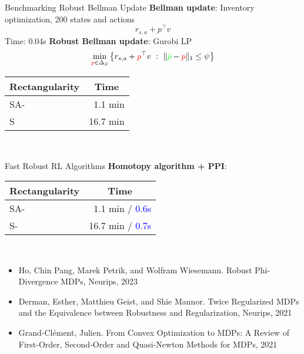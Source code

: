 \documentclass{beamer}
\newcommand{\tc}[2]{\textcolor{#1}{#2}}
\newcommand{\tcb}[1]{\tc{blue}{#1}}
\newcommand{\tcr}[1]{\tc{red}{#1}}
\newcommand{\tcg}[1]{\tc{green}{#1}}
\newcommand{\tr}{^{\top}}
\begin{document}
\begin{frame}{Benchmarking Robust Bellman Update}
    \textbf{Bellman update}: {\footnotesize Inventory optimization, 200 states and actions}
    \[  r_{s,a} + p\tr v  \]
    Time: 0.04s
    \vfill
    \textbf{Robust Bellman update}: 	{\small Gurobi LP}
    \[ \min_{\tcr{p}\in\Delta_S}  \left\{ r_{s,a} + \tcr{p}\tr v   ~:~ \| \tcg{\bar{p}} - \tcr{p} \|_1 \le \psi \right\} \]
    \begin{center}
    \begin{tabular}{|l|r|}
        \toprule
    \textbf{Rectangularity} & \multicolumn{1}{c|}{\textbf{Time}} \\
        \midrule
        SA- & 1.1 min  \\
        \hline
        S & 16.7 min \\
        \bottomrule
    \end{tabular} \\[0.3cm]
    \end{center}
\end{frame}

\begin{frame}{Fast Robust RL Algorithms}
\textbf{Homotopy algorithm + PPI}:
\begin{center}
\begin{tabular}{|l|r|}
    \toprule
    \textbf{Rectangularity} & \multicolumn{1}{c|}{\textbf{Time}} \\
    \midrule
    SA- & 1.1 min / \tcb{0.6s} \\
    \hline
    S- & 16.7 min / \tcb{0.7s} \\
    \bottomrule
\end{tabular} \\[0.3cm]
\end{center}
{\tiny
  \begin{itemize}
  \item Ho, Chin Pang, Marek Petrik, and Wolfram Wiesemann. Robust Phi-Divergence MDPs, Neurips, 2023
  \item Derman, Esther, Matthieu Geist, and Shie Mannor. Twice Regularized MDPs and the Equivalence between Robustness and Regularization, Neurips, 2021
  \item Grand-Clément, Julien. From Convex Optimization to MDPs: A Review of First-Order, Second-Order and Quasi-Newton Methods for MDPs, 2021
  \end{itemize}
}
\end{frame}
\end{document}
